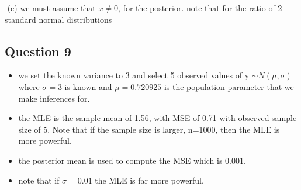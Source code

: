 \documentclass[
]{book}
\providecommand{\tightlist}{%
  \setlength{\itemsep}{0pt}\setlength{\parskip}{0pt}}
\theoremstyle{definition}
\theoremstyle{definition}
\theoremstyle{definition}
\theoremstyle{definition}
\theoremstyle{remark}
\begin{document}
-(c) we must assume that \(x\neq 0\), for the posterior. note that for the ratio of 2 standard normal distributions

\hypertarget{question-9-1}{%
\subsection*{Question 9}\label{question-9-1}}

\begin{itemize}
\tightlist
\item
  we set the known variance to 3 and select 5 observed values of y \(\sim N(\mu,\sigma)\) where \(\sigma=3\) is known and \(\mu=0.720925\) is the population parameter that we make inferences for.
\item
  the MLE is the sample mean of 1.56, with MSE of 0.71 with observed sample size of 5. Note that if the sample size is larger, n=1000, then the MLE is more powerful.
\item
  the posterior mean is used to compute the MSE which is 0.001.
\item
  note that if \(\sigma=0.01\) the MLE is far more powerful.
\end{itemize}
\end{document}
